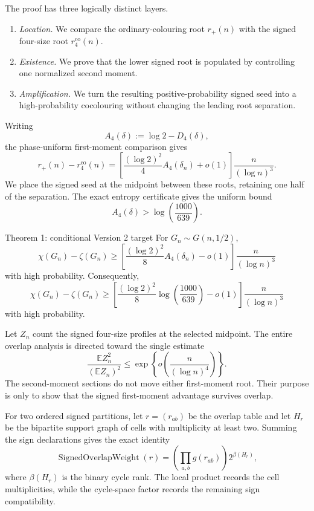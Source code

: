 The proof has three logically distinct layers.

\begin{enumerate}
\item \emph{Location.}  We compare the ordinary-colouring root $r_+(n)$ with
      the signed four-size root $r_4^{\mathrm{co}}(n)$.
\item \emph{Existence.}  We prove that the lower signed root is populated by
      controlling one normalized second moment.
\item \emph{Amplification.}  We turn the resulting positive-probability signed
      seed into a high-probability cocolouring without changing the leading
      root separation.
\end{enumerate}

Writing
\[
  A_4(\delta):=\log2-D_4(\delta),
\]
the phase-uniform first-moment comparison gives
\[
  r_+(n)-r_4^{\mathrm{co}}(n)
  =
  \left[
    \frac{(\log2)^2}{4}A_4(\delta_n)+o(1)
  \right]
  \frac{n}{(\log n)^3}.
\]
We place the signed seed at the midpoint between these roots, retaining one
half of the separation.  The exact entropy certificate gives the uniform bound
\[
  A_4(\delta)>\log\!\left(\frac{1000}{639}\right).
\]

\begin{resultbox}{Theorem 1: conditional Version 2 target}
For $G_n\sim G(n,1/2)$,
\[
  \chi(G_n)-\zeta(G_n)
  \ge
  \left[
    \frac{(\log2)^2}{8}A_4(\delta_n)-o(1)
  \right]
  \frac{n}{(\log n)^3}
\]
with high probability.  Consequently,
\[
  \chi(G_n)-\zeta(G_n)
  \ge
  \left[
    \frac{(\log2)^2}{8}
      \log\!\left(\frac{1000}{639}\right)-o(1)
  \right]
  \frac{n}{(\log n)^3}
\]
with high probability.
\end{resultbox}

Let $Z_n$ count the signed four-size profiles at the selected midpoint.  The
entire overlap analysis is directed toward the single estimate
\[
  \frac{\mathbb E Z_n^2}{(\mathbb E Z_n)^2}
  \le
  \exp\!\left\{
    o\!\left(\frac{n}{(\log n)^4}\right)
  \right\}.
\]
The second-moment sections do not move either first-moment root.  Their purpose
is only to show that the signed first-moment advantage survives overlap.

For two ordered signed partitions, let $r=(r_{ab})$ be the overlap table and
let $H_r$ be the bipartite support graph of cells with multiplicity at least
two.  Summing the sign declarations gives the exact identity
\[
  \operatorname{SignedOverlapWeight}(r)
  =
  \left(\prod_{a,b}g(r_{ab})\right)2^{\beta(H_r)},
\]
where $\beta(H_r)$ is the binary cycle rank.  The local product records the cell
multiplicities, while the cycle-space factor records the remaining sign
compatibility.

